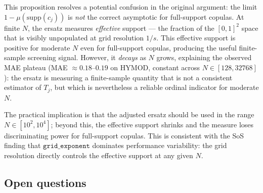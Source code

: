 \documentclass[11pt,a4paper]{article}
\theoremstyle{definition}
\begin{document}
This proposition resolves a potential confusion in the original argument:
the limit $1 - \mu(\mathrm{supp}(c_j))$ is \emph{not} the correct
asymptotic for full-support copulas.  At finite $N$, the ersatz measures
\emph{effective} support — the fraction of the $[0,1]^2$ space that is
visibly unpopulated at grid resolution $1/s$.  This effective support is
positive for moderate $N$ even for full-support copulas, producing the
useful finite-sample screening signal.  However, it \emph{decays} as $N$
grows, explaining the observed MAE plateau (MAE $\approx 0.18$--$0.19$ on
HYMOD, constant across $N \in [128, 32768]$): the ersatz is measuring a
finite-sample quantity that is not a consistent estimator of $T_j$,
but which is nevertheless a reliable ordinal indicator for moderate $N$.

The practical implication is that the adjusted ersatz should be used in the
range $N \in [10^2, 10^4]$; beyond this, the effective support shrinks and
the measure loses discriminating power for full-support copulas.  This is
consistent with the SoS finding that $\texttt{grid\_exponent}$ dominates
performance variability: the grid resolution directly controls the
effective support at any given $N$.

\subsection{Open questions}
\end{document}

